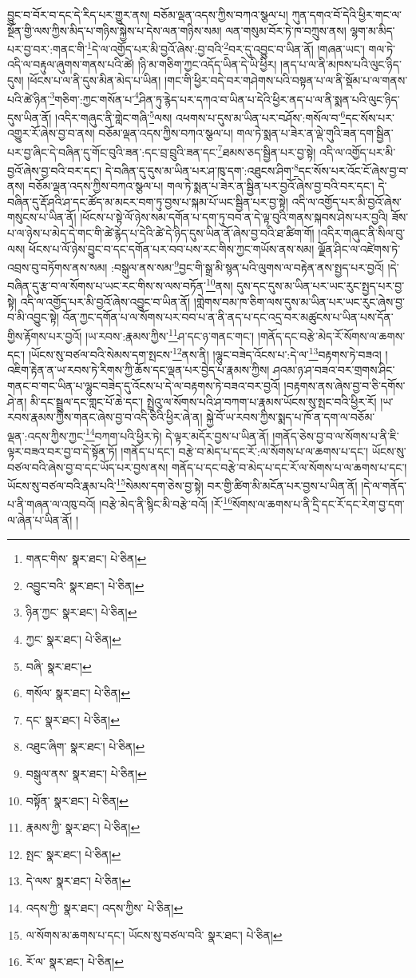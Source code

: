 བྱུང་བ་བོར་བ་དང་དེ་རིད་པར་གྱུར་ནས། བཅོམ་ལྡན་འདས་ཀྱིས་བཀའ་སྩལ་པ། ཀུན་དགའ་བོ་དེའི་ཕྱིར་གང་ལ་སྔོན་གྱི་ལས་ཀྱིས་མིད་པ་གཉིས་སྐྱེས་པ་དེས་ལན་གཉིས་སམ། ལན་གསུམ་བོར་ཏེ་ཁ་བཀྲུས་ནས། ལྷག་མ་མིད་པར་བྱ་བར་:གནང་གི་\footnote{གནང་གིས་  སྣར་ཐང་།  པེ་ཅིན། }དེ་ལ་འགྱོད་པར་མི་བྱའོ་ཞེས་:བྱ་བའི་\footnote{འབྱུང་བའི་  སྣར་ཐང་།  པེ་ཅིན། }བར་དུ་འབྱུང་བ་ཡིན་ནོ། །གཞན་ཡང་། གལ་ཏེ་འདི་ལ་བརྟུལ་ཞུགས་གནས་པའི་ཚེ། །ཉི་མ་གཅིག་ཀྱང་འདོད་ཡིན་དེ་ཡི་ཕྱིར། །ནད་པ་ལ་ནི་མཁས་པའི་ལུང་ཉིད་དུས། །ཕོངས་པ་ལ་ནི་དུས་མིན་མེད་པ་ཡིན། །གང་གི་ཕྱིར་བདེ་བར་གཤེགས་པའི་བསྟན་པ་ལ་ནི་སྡོམ་པ་ལ་གནས་པའི་ཚེ་ཉིན་\footnote{ཉིན་ཀྱང་  སྣར་ཐང་།  པེ་ཅིན། }གཅིག་:ཀྱང་གསོན་པ་\footnote{ཀྱང་  སྣར་ཐང་།  པེ་ཅིན། }ཤིན་ཏུ་རྙེད་པར་དཀའ་བ་ཡིན་པ་དེའི་ཕྱིར་ནད་པ་ལ་ནི་སྨན་པའི་ལུང་ཉིད་དུས་ཡིན་ནོ། །འདིར་གཞུང་ནི་གླེང་གཞི་\footnote{བཞི་  སྣར་ཐང་། }ལས། འཕགས་པ་དུས་མ་ཡིན་པར་བཤོས་:གསོལ་བ་\footnote{གསོལ་  སྣར་ཐང་།  པེ་ཅིན། }དང་སོས་པར་འགྱུར་རོ་ཞེས་བྱ་བ་ནས། བཅོམ་ལྡན་འདས་ཀྱིས་བཀའ་སྩལ་པ། གལ་ཏེ་སྨན་པ་ཟེར་ན་ལྡེ་གུའི་ཟན་དག་སྦྱིན་པར་བྱ་ཞིང་དེ་བཞིན་དུ་གོང་བུའི་ཟན་:དང་བྲ་བྲུའི་ཟན་དང་\footnote{དང་  སྣར་ཐང་།  པེ་ཅིན། }ཐམས་ཅད་སྦྱིན་པར་བྱ་སྟེ། འདི་ལ་འགྱོད་པར་མི་བྱའོ་ཞེས་བྱ་བའི་བར་དང་། དེ་བཞིན་དུ་དུས་མ་ཡིན་པར་ཤ་ཁུ་དག་:འཐུངས་ཤིག་\footnote{འཐུང་ཞིག་  སྣར་ཐང་།  པེ་ཅིན། }དང་སོས་པར་འོང་ངོ་ཞེས་བྱ་བ་ནས། བཅོམ་ལྡན་འདས་ཀྱིས་བཀའ་སྩལ་པ། གལ་ཏེ་སྨན་པ་ཟེར་ན་སྦྱིན་པར་བྱའོ་ཞེས་བྱ་བའི་བར་དང་། དེ་བཞིན་དུ་རྡོ་ཤའི་ཤ་དང་ཚོད་མ་མངར་བག་ཏུ་བྱས་པ་སྐམ་པོ་ཡང་སྦྱིན་པར་བྱ་སྟེ། འདི་ལ་འགྱོད་པར་མི་བྱའོ་ཞེས་གསུངས་པ་ཡིན་ནོ། །ཕོངས་པ་སྟེ་ལོ་ཉེས་སམ་དགོན་པ་དག་ཏུ་བབ་ན་དེ་ལྟ་བུའི་གནས་སྐབས་ཤེས་པར་བྱའི། ཟོས་པ་ལ་ཉེས་པ་མེད་དེ་གང་གི་ཚེ་རྙེད་པ་དེའི་ཚེ་དེ་ཉིད་དུས་ཡིན་ནོ་ཞེས་བྱ་བའི་ཐ་ཚིག་གོ། །འདིར་གཞུང་ནི་སིལ་བུ་ལས། ཕོངས་པ་ལོ་ཉེས་བྱུང་བ་དང་དགོན་པར་བབ་པས་རང་གིས་ཀྱང་གཡོས་ནས་སམ། ལྗོན་ཤིང་ལ་འཛེགས་ཏེ་འབྲས་བུ་བཏོགས་ནས་སམ། :བསྒུལ་ནས་སམ་\footnote{བསྒུལ་ནས་  སྣར་ཐང་།  པེ་ཅིན། }བྱང་གི་སྒྲ་མི་སྙན་པའི་ལུགས་ལ་བརྟེན་ནས་སྤྱད་པར་བྱའོ། །དེ་བཞིན་དུ་རྩ་བ་ལ་སོགས་པ་ཡང་རང་གིས་ས་ལས་བཏོན་\footnote{བསྟོན་  སྣར་ཐང་།  པེ་ཅིན། }ནས། དུས་དང་དུས་མ་ཡིན་པར་ཡང་རུང་སྤྱད་པར་བྱ་སྟེ། འདི་ལ་འགྱོད་པར་མི་བྱའོ་ཞེས་འབྱུང་བ་ཡིན་ནོ། །གླེགས་བམ་ཁ་ཅིག་ལས་དུས་མ་ཡིན་པར་ཡང་རུང་ཞེས་བྱ་བ་མི་འབྱུང་སྟེ། འོན་ཀྱང་དགོན་པ་ལ་སོགས་པར་བབ་པ་ན་ནི་ནད་པ་དང་འདྲ་བར་མཚུངས་པ་ཡིན་པས་དོན་གྱིས་རྟོགས་པར་བྱའོ། །ཡ་རབས་:རྣམས་ཀྱིས་\footnote{རྣམས་ཀྱི་  སྣར་ཐང་།  པེ་ཅིན། }ཤ་དང་ཉ་གནང་གང་། །གནོད་དང་བརྩེ་མེད་རོ་སོགས་ལ་ཆགས་དང་། །ཡོངས་སུ་བཙལ་བའི་སེམས་དག་སྤངས་\footnote{སྤང་  སྣར་ཐང་།  པེ་ཅིན། }ནས་ནི། །ལྷུང་བཟེད་འོངས་པ་:དེ་ལ་\footnote{དེ་ལས་  སྣར་ཐང་།  པེ་ཅིན། }བརྟགས་ཏེ་བཟའ། །འཇིག་རྟེན་ན་ཡ་རབས་ཏེ་རིགས་ཀྱི་ཆོས་དང་ལྡན་པར་བྱེད་པ་རྣམས་ཀྱིས། ཤའམ་ཉ་ཤ་བཟའ་བར་གྲགས་ཤིང་གནང་བ་གང་ཡིན་པ་ལྷུང་བཟེད་དུ་འོངས་པ་དེ་ལ་བརྟགས་ཏེ་བཟའ་བར་བྱའོ། །བརྟགས་ནས་ཞེས་བྱ་བ་ཅི་དགོས་ཤེ་ན། མི་དང་སྦྲུལ་དང་གླང་པོ་ཆེ་དང་། སྤྲེའུ་ལ་སོགས་པའི་ཤ་བཀག་པ་རྣམས་ཡོངས་སུ་སྤང་བའི་ཕྱིར་རོ། །ཡ་རབས་རྣམས་ཀྱིས་གནང་ཞེས་བྱ་བ་འདི་ཅིའི་ཕྱིར་ཞེ་ན། སྐྱེ་བོ་ཡ་རབས་ཀྱིས་སྨད་པ་ཁོ་ན་དག་ལ་བཅོམ་ལྡན་:འདས་ཀྱིས་ཀྱང་\footnote{འདས་ཀྱི་  སྣར་ཐང་། འདས་ཀྱིས་  པེ་ཅིན། }བཀག་པའི་ཕྱིར་ཏེ། དེ་ལྟར་མདོར་བྱས་པ་ཡིན་ནོ། །གནོད་ཅེས་བྱ་བ་ལ་སོགས་པ་ནི་ཇི་ལྟར་བཟའ་བར་བྱ་བ་དེ་སྟོན་ཏོ། །གནོད་པ་དང་། བརྩེ་བ་མེད་པ་དང་རོ་:ལ་སོགས་པ་ལ་ཆགས་པ་དང་། ཡོངས་སུ་བཙལ་བའི་ཞེས་བྱ་བ་དང་ཡོད་པར་བྱས་ནས། གནོད་པ་དང་བརྩེ་བ་མེད་པ་དང་རོ་ལ་སོགས་པ་ལ་ཆགས་པ་དང་། ཡོངས་སུ་བཙལ་བའི་རྣམ་པའི་\footnote{ལ་སོགས་མ་ཆགས་པ་དང་། ཡོངས་སུ་བཙལ་བའི་  སྣར་ཐང་།  པེ་ཅིན། }སེམས་དག་ཅེས་བྱ་སྟེ། བར་གྱི་ཚིག་མི་མངོན་པར་བྱས་པ་ཡིན་ནོ། །དེ་ལ་གནོད་པ་ནི་གཞན་ལ་འཁུ་བའོ། །བརྩེ་མེད་ནི་སྙིང་མི་བརྩེ་བའོ། །རོ་\footnote{རོ་ལ་  སྣར་ཐང་།  པེ་ཅིན། }སོགས་ལ་ཆགས་པ་ནི་དྲི་དང་རོ་དང་རེག་བྱ་དག་ལ་ཞེན་པ་ཡིན་ནོ། །

